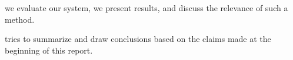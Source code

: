  we evaluate our system, we present results, and discuss the
relevance of such a method.

 tries to summarize and draw conclusions based on the claims made at
the beginning of this report.
